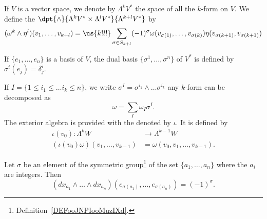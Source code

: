 \begin{definition}
    If $V$ is a vector space, we denote by $\Lambda^kV^*$ the space of all the $k$-form on $V$. We define the  $\dpt{\wedge}{\Lambda^kV^*\times\Lambda^lV^*}{\Lambda^{k+l}V^*}$ by
    \begin{equation}
      (\omega^k\wedge\eta^l)(v_1,\ldots,v_{k+l})
      =\us{k!l!}\sum_{\sigma\in S_{k+l}} (-1)^{\sigma}   \omega(v_{\sigma(1)},\ldots,v_{\sigma(k)})\eta(v_{\sigma(k+1)},v_{\sigma(k+1)})
    \end{equation}
\end{definition}
If $\{e_1,\ldots,e_n\}$ is a basis of $V$, the dual basis $\{\sigma^1,\ldots,\sigma^n\}$ of $V^*$ is defined by $\sigma^i(e_j)=\delta^i_j$.

If $I=\{1\leq i_1\leq\ldots i_k\leq n\}$, we write $\sigma^I=\sigma^{i_1}\wedge\ldots\sigma^{i_k}$ any $k$-form can be decomposed as
\[
  \omega=\sum_{I}\omega_I\sigma^I.
\]
The exterior algebra is provided with the  denoted by $\iota$. It is defined by\label{pg_DefProdExt}
\begin{equation}
\begin{aligned}
 \iota(v_0)\colon\Lambda^kW&\to \Lambda^{k-1}W \\
(\iota(v_0)\omega)(v_1,\ldots,v_{k-1})& =\omega(v_0,v_1,\ldots,v_{k-1}).
\end{aligned}
\end{equation}

\begin{lemma}
    Let \( \sigma\) be an element of the symmetric group\footnote{Definition~\ref{DEFooJNPIooMuzIXd}.} of the set \( \{ a_1,\ldots, a_n \}\) where the \( a_i\) are integers. Then
    \begin{equation}
        (dx_{a_1}\wedge\ldots \wedge dx_{a_n})(e_{\sigma(a_1)},\ldots, e_{\sigma(a_n)})=(-1)^{\sigma}.
    \end{equation}
\end{lemma}

